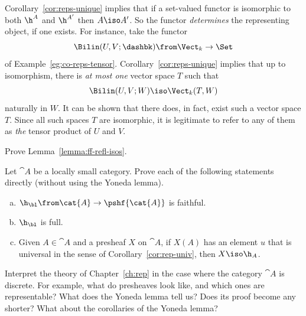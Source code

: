 \begin{example}
Corollary~\ref{cor:reps-unique} implies that if a set-valued functor is
isomorphic to both $\h^A$ and $\h^{A'}$ then $A \iso A'$.  So the functor
\emph{determines} the representing object, if one exists.  For instance, take
the functor 
\[
\Bilin(U, V; \dashbk)\from \Vect_k \to \Set
%
\index{map!bilinear}
%
\]
of Example~\ref{eg:co-reps-tensor}.  Corollary~\ref{cor:reps-unique}
implies that up to isomorphism, there is \emph{at most one} vector space
$T$ such that
\[
\Bilin(U, V; W) \iso \Vect_k(T, W)
\]
naturally in $W$.  It can be shown that there does, in fact, exist such a
vector space $T$.  Since all such spaces $T$ are isomorphic, it is
legitimate to refer to any of them as \emph{the}%
%
%
tensor%
%
%
product of $U$ and $V$.
\end{example}
%
%

\exs


\begin{question}        
\label{ex:ff-refl-isos}
Prove Lemma~\ref{lemma:ff-refl-isos}.
\end{question}


\begin{question}
Let $\cat{A}$ be a locally small category.  Prove each of the following
statements directly (without using the Yoneda lemma).
% 
\begin{enumerate}[(b)]
\item 
$\h_\bl\from \cat{A} \to \pshf{\cat{A}}$ is faithful.

\item 
$\h_\bl$ is full.

\item
Given $A \in \cat{A}$ and a presheaf $X$ on $\cat{A}$, if $X(A)$ has an
element $u$ that is universal in the sense of Corollary~\ref{cor:rep-univ},
then $X \iso \h_A$.
\end{enumerate}
\end{question}


\begin{question}
Interpret the theory of Chapter~\ref{ch:rep} in the case where the category
$\cat{A}$ is discrete.  For example, what do presheaves look like, and
which ones are representable?  What does the Yoneda lemma tell us?  Does
its proof become any shorter?  What about the corollaries of the Yoneda
lemma?
\end{question}


